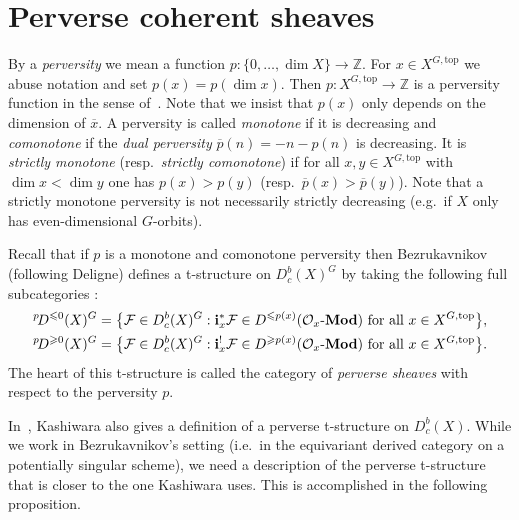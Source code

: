 \documentclass{compositio}
\theoremstyle{plain}
\theoremstyle{definition}
\theoremstyle{remark}
\newcommand\sheaf{\mathcal}
\newcommand\cat{\mathbf}
\newcommand\catModules[1]{#1\text{-}\cat{Mod}}
\newcommand\perv[1][p]{\mkern1mu{}^{#1}\mkern-3mu}
\newcommand\Xtop[1][X]{#1^{G,\mathrm{top}}}
\begin{document}
\section{Perverse coherent sheaves}
\label{sec:Kashiwara}%

By a \emph{perversity} we mean a function $p\colon \{0,\dotsc,\dim X\} \to  \mathbb{Z}$.
For $x \in  \Xtop$ we abuse notation and set $p(x) = p(\dim x)$.
Then $p\colon \Xtop \to  \mathbb{Z}$ is a perversity function in the sense of~\cite{Bezrukavnikov:arXiv:PerverseCoherentSheaves}.
Note that we insist that $p(x)$ only depends on the dimension of $\overline x$.
A perversity is called \emph{monotone} if it is decreasing and \emph{comonotone} if the \emph{dual perversity} $\overline p(n) = -n - p(n)$ is decreasing.
It is \emph{strictly monotone} (resp.~\emph{strictly comonotone}) if for all $x,y \in  \Xtop$ with $\dim x < \dim y$ one has $p(x) > p(y)$ (resp.~$\overline p(x) > \overline p(y)$).
Note that a strictly monotone perversity is not necessarily strictly decreasing (e.g.~if $X$ only has even-dimensional $G$-orbits).

Recall that if $p$ is a monotone and comonotone perversity then Bezrukavnikov (following Deligne) defines a t-structure on $D_c^b(X)^G$ by taking the following full subcategories \cite{Bezrukavnikov:arXiv:PerverseCoherentSheaves,ArinkinBezrukavnikov:arXiv:PerverseCoherentSheaves}:
\begin{align*}
    \perv[p] D^{\leq 0}(X)^G & = 
    \bigl\{ \sheaf F \in  D_c^b(X)^G : \mathbf i_x^*\sheaf F \in  D^{\leq p(x)}(\catModules{\sheaf{O}_x}) \text{ for all $x \in  \Xtop$}\bigr\}, \\
    \perv[p] D^{\geq 0}(X)^G & = 
    \bigl\{ \sheaf F \in  D_c^b(X)^G : \mathbf i_x^!\sheaf F \in  D^{\geq p(x)}(\catModules{\sheaf{O}_x}) \text{ for all $x \in  \Xtop$}\bigr\}.
\end{align*}
The heart of this t-structure is called the category of \emph{perverse sheaves} with respect to the perversity $p$.

In~\cite{Kashiwara:2004:tStructureOnHolonomicDModuleCoherentOModules}, Kashiwara also gives a definition of a perverse t-structure on $D^b_{c}(X)$.
While we work in Bezrukavnikov's setting (i.e.\ in the equivariant derived category on a potentially singular scheme), we need a description of the perverse t-structure that is closer to the one Kashiwara uses.
This is accomplished in the following proposition.
\end{document}
